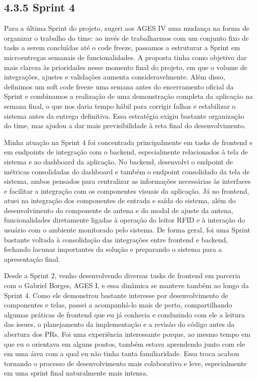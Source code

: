 \hypertarget{__RefHeading___Toc4823_3118176633}{}
\subsection*{4.3.5 Sprint 4}
\label{unit:ages-iii-sprint-4}
\indent \originaltab{}Para a última Sprint do projeto, sugeri aos AGES IV uma mudança na forma de organizar o trabalho do time: ao invés de trabalharmos com um conjunto fixo de tasks a serem concluídas até o code freeze, passamos a estruturar a Sprint em microentregas semanais de funcionalidades. A proposta tinha como objetivo dar mais clareza às prioridades nesse momento final do projeto, em que o volume de integrações, ajustes e validações aumenta consideravelmente. Além disso, definimos um soft code freeze uma semana antes do encerramento oficial da Sprint e combinamos a realização de uma demonstração completa da aplicação na semana final, o que nos daria tempo hábil para corrigir falhas e estabilizar o sistema antes da entrega definitiva. Essa estratégia exigiu bastante organização do time, mas ajudou a dar mais previsibilidade à reta final do desenvolvimento.\par

\indent Minha atuação na Sprint 4 foi concentrada principalmente em tasks de frontend e em endpoints de integração com o backend, especialmente relacionados à tela de sistema e ao dashboard da aplicação. No backend, desenvolvi o endpoint de métricas consolidadas do dashboard e também o endpoint consolidado da tela de sistema, ambos pensados para centralizar as informações necessárias às interfaces e facilitar a integração com os componentes visuais da aplicação. Já no frontend, atuei na integração dos componentes de entrada e saída do sistema, além do desenvolvimento do componente de antena e do modal de ajuste da antena, funcionalidades diretamente ligadas à operação do leitor RFID e à interação do usuário com o ambiente monitorado pelo sistema. De forma geral, foi uma Sprint bastante voltada à consolidação das integrações entre frontend e backend, fechando lacunas importantes da solução e preparando o sistema para a apresentação final.\par

\indent Desde a Sprint 2, venho desenvolvendo diversas tasks de frontend em parceria com o Gabriel Borges, AGES I, e essa dinâmica se manteve também ao longo da Sprint 4. Como ele demonstrou bastante interesse por desenvolvimento de componentes e telas, passei a acompanhá-lo mais de perto, compartilhando algumas práticas de frontend que eu já conhecia e conduzindo com ele a leitura das issues, o planejamento da implementação e a revisão do código antes da abertura dos PRs. Foi uma experiência interessante porque, ao mesmo tempo em que eu o orientava em alguns pontos, também estava aprendendo junto com ele em uma área com a qual eu não tinha tanta familiaridade. Essa troca acabou tornando o processo de desenvolvimento mais colaborativo e leve, especialmente em uma sprint final naturalmente mais intensa.\par

